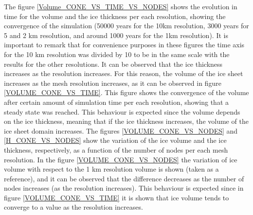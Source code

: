 \documentclass{article}
\begin{document}
The figure \ref{Volume_CONE_VS_TIME_VS_NODES} shows the evolution in time for the volume and the ice thickness per each resolution, showing the convergence of the simulation (50000 years for the 10km resolution, 3000 years for 5 and 2 km resolution, and around 1000 years for the 1km resolution). It is important to remark that for convenience purposes in these figures the time axis for the 10 km resolution was divided by 10 to be in the same scale with the results for the other resolutions. It can be observed that the ice thickness increases as the resolution increases. For this reason, the volume of the ice sheet increases as the mesh resolution increases, as it can be observed in figure \ref{VOLUME_CONE_VS_TIME}. This figure shows the convergence of the volume after certain amount of simulation time per each resolution, showing that a steady state was reached. This behaviour is expected since the volume depends on the ice thickness, meaning that if the ice thickness increases, the volume of the ice sheet domain increases. The figures \ref{VOLUME_CONE_VS_NODES} and \ref{H_CONE_VS_NODES} show the variation of the ice volume and the ice thickness, respectively, as a function of the number of nodes per each mesh resolution. In the figure \ref{VOLUME_CONE_VS_NODES} the variation of ice volume with respect to the 1 km resolution volume is shown (taken as a reference), and it can be observed that the difference decreases as the number of nodes increases (as the resolution increases). This behaviour is expected since in figure \ref{VOLUME_CONE_VS_TIME} it is shown that ice volume tends to converge to a value as the resolution increases.
\end{document}
